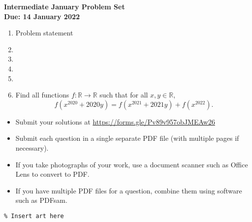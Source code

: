 \documentclass{article}
\begin{document}
\thispagestyle{empty}

\begin{center}
  \textbf{\Large Intermediate January Problem Set}
  \\ \vspace{1em}
  \textbf{\large Due: 14 January 2022}
\end{center}

\bigskip

\begin{enumerate}[itemsep=\fill]

\item %
Problem statement


\item %


\item %


\item %


\item %


\item %
Find all functions $f : \mathbb{R} \to \mathbb{R}$ such that for all $x,y \in \mathbb{R}$,
\[ f(x^{2020} +2020y) = f(x^{2021} +2021y) +f(x^{2022}). \]

\end{enumerate}


\vfill
\small
\begin{itemize}
	\item Submit your solutions at \href{https://forms.gle/Pv89v957obJMEAw26}{https://forms.gle/Pv89v957obJMEAw26}
	\item Submit each question in a single separate PDF file (with multiple pages if necessary).
	\item If you take photographs of your work, use a document scanner such as Office Lens to convert to PDF.
	\item If you have multiple PDF files for a question, combine them using software such as PDFsam.
\end{itemize}

\vfill
\centering
\small
\begin{BVerbatim}
\end{BVerbatim}
\end{document}
